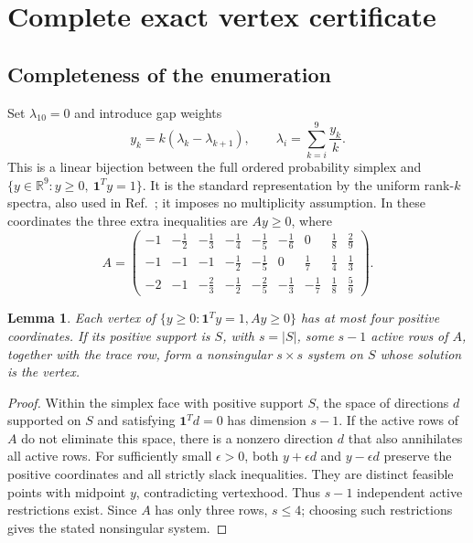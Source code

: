 \documentclass[aps,pra,onecolumn,notitlepage,10pt,amsmath,amssymb,longbibliography,nofootinbib]{revtex4-2}
\newtheorem{lemma}{Lemma}
\newcommand{\R}{\mathbb{R}}
\begin{document}
\section{Complete exact vertex certificate}
\label{sec:certificate}

\subsection{Completeness of the enumeration}

Set $\lambda_{10}=0$ and introduce gap weights
\begin{equation}
 y_k=k(\lambda_k-\lambda_{k+1}),\qquad
 \lambda_i=\sum_{k=i}^9\frac{y_k}{k}.
 \label{eq:gaps}
\end{equation}
This is a linear bijection between the full ordered probability simplex and
$\{y\in\R^9:y\geq0,\ \boldsymbol{1}^Ty=1\}$.
It is the standard representation by the uniform rank-$k$ spectra, also used
in Ref.~\cite{AhiableKothakondaWinter}; it imposes no multiplicity assumption.
In these coordinates the three extra inequalities are $Ay\geq0$, where
\begin{equation}
 A=\begin{pmatrix}
 -1&-\frac12&-\frac13&-\frac14&-\frac15&-\frac16&0&\frac18&\frac29\\[2pt]
 -1&-1&-1&-\frac12&-\frac15&0&\frac17&\frac14&\frac13\\[2pt]
 -2&-1&-\frac23&-\frac12&-\frac25&-\frac13&-\frac17&\frac18&\frac59
 \end{pmatrix}.
 \label{eq:A}
\end{equation}

\begin{lemma}
\label{lem:complete}
Each vertex of $\{y\geq0:\boldsymbol{1}^Ty=1,Ay\geq0\}$ has at most four
positive coordinates. If its positive support is $S$, with $s=|S|$, some
$s-1$ active rows of $A$, together with the trace row, form a nonsingular
$s\times s$ system on $S$ whose solution is the vertex.
\end{lemma}
\begin{proof}
Within the simplex face with positive support $S$, the space of directions
$d$ supported on $S$ and satisfying $\boldsymbol{1}^Td=0$ has dimension $s-1$.
If the active rows of $A$ do not eliminate this space, there is a nonzero
direction $d$ that also annihilates all active rows. For sufficiently small
$\epsilon>0$, both $y+\epsilon d$ and $y-\epsilon d$ preserve the positive
coordinates and all strictly slack inequalities. They are distinct feasible
points with midpoint $y$, contradicting vertexhood. Thus $s-1$ independent
active restrictions exist. Since $A$ has only three rows, $s\leq4$; choosing
such restrictions gives the stated nonsingular system.
\end{proof}
\end{document}

